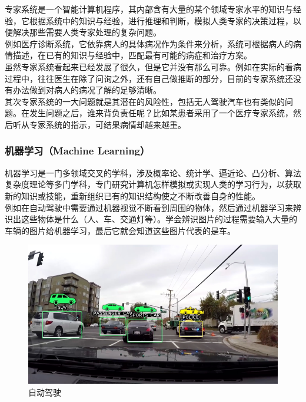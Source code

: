 专家系统是一个智能计算机程序，其内部含有大量的某个领域专家水平的知识与经验，它根据系统中的知识与经验，进行推理和判断，模拟人类专家的决策过程，以便解决那些需要人类专家处理的复杂问题。\\

例如医疗诊断系统，它依靠病人的具体病况作为条件来分析，系统可根据病人的病情描述，在已有的知识与经验中，匹配最有可能的病症和治疗方案。\\

虽然专家系统看起来已经发展了很久，但是它并没有那么可靠。例如在实际的看病过程中，往往医生在除了问询之外，还有自己做推断的部分，目前的专家系统还没有办法做到对病人的病况了解的足够清晰。\\

其次专家系统的一大问题就是其潜在的风险性，包括无人驾驶汽车也有类似的问题。在发生问题之后，谁来背负责任呢？比如某患者采用了一个医疗专家系统，然后听从专家系统的指示，可结果病情却越来越重。\\

\subsubsection{机器学习（Machine Learning）}

机器学习是一门多领域交叉的学科，涉及概率论、统计学、逼近论、凸分析、算法复杂度理论等多门学科，专门研究计算机怎样模拟或实现人类的学习行为，以获取新的知识或技能，重新组织已有的知识结构使之不断改善自身的性能。\\

例如在自动驾驶中需要通过机器视觉不断看到周围的物体，然后通过机器学习来辨识出这些物体是什么（人、车、交通灯等）。学会辨识图片的过程需要输入大量的车辆的图片给机器学习，最后它就会知道这些图片代表的是车。

\begin{figure}[H]
    \centering
    \includegraphics{img/C1/1-1/1.png}
    \caption{自动驾驶}
\end{figure}


